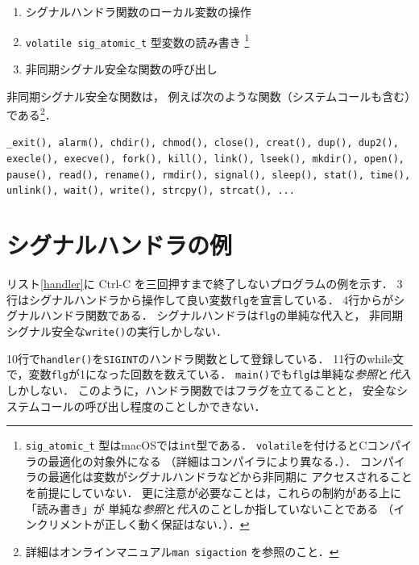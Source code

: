 \begin{enumerate}
\item シグナルハンドラ関数のローカル変数の操作
\item \texttt{volatile sig\_atomic\_t} 型変数の読み書き
  \footnote{\texttt{sig\_atomic\_t} 型はmacOSでは\texttt{int}型である．
    \texttt{volatile}を付けるとCコンパイラの最適化の対象外になる
           （詳細はコンパイラにより異なる．）．
           コンパイラの最適化は変数がシグナルハンドラなどから非同期に
           アクセスされることを前提にしていない．
           更に注意が必要なことは，これらの制約がある上に「読み書き」が
           単純な\emph{参照}と\emph{代入}のことしか指していないことである
           （インクリメントが正しく動く保証はない．）．}
\item 非同期シグナル安全な関数の呼び出し
\end{enumerate}

非同期シグナル安全な関数は，
例えば次のような関数（システムコールも含む）である\footnote{
詳細はオンラインマニュアル\texttt{man sigaction} を参照のこと．}．

\texttt{\_exit(), alarm(), chdir(), chmod(), close(), creat(), dup(),
dup2(), execle(), execve(), fork(), kill(), link(), lseek(), mkdir(),
open(), pause(), read(), rename(), rmdir(), signal(), sleep(), stat(),
time(), unlink(), wait(), write(), strcpy(), strcat(), ...}

\section{シグナルハンドラの例}
リスト\ref{handler}に Ctrl-C を三回押すまで終了しないプログラムの例を示す．
3行はシグナルハンドラから操作して良い変数\texttt{flg}を宣言している．
4行からがシグナルハンドラ関数である．
シグナルハンドラは\texttt{flg}の単純な代入と，
非同期シグナル安全な\texttt{write()}の実行しかしない．



10行で\texttt{handler()}を\texttt{SIGINT}のハンドラ関数として登録している．
11行のwhile文で，変数\texttt{flg}が1になった回数を数えている．
\texttt{main()}でも\texttt{flg}は単純な\emph{参照}と\emph{代入}しかしない．
このように，ハンドラ関数ではフラグを立てることと，
安全なシステムコールの呼び出し程度のことしかできない．

